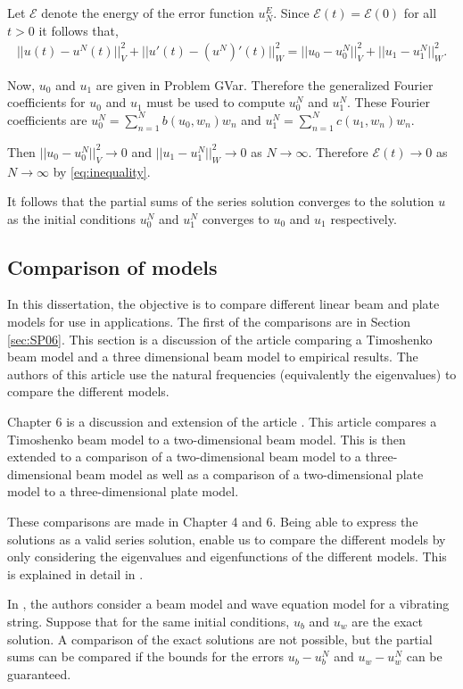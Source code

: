 \documentclass[../../main.tex]{subfiles}
\begin{document}
Let $\mathcal{E}$ denote the energy of the error function $u^E_N$. Since $\mathcal{E}(t) = \mathcal{E}(0)$ for all $t>0$ it follows that, 
\begin{eqnarray}
	||u(t) -  u^N(t)||_V^2 + ||u'(t) - (u^N)'(t)||^2_W = ||u_0 - u^N_0||_V^2 + ||u_1 - u^N_1||_W^2. \label{eq:inequality}
\end{eqnarray}

Now, $u_0$ and $u_1$ are given in Problem GVar. Therefore the generalized Fourier coefficients for $u_0$ and $u_1$ must be used to compute $u_0^N$ and $u_1^N$. These Fourier coefficients are $\displaystyle u_0^N = \sum_{n=1}^{N} b(u_0, w_n)w_n$ and $\displaystyle u_1^N = \sum_{n=1}^{N} c(u_1, w_n)w_n$.

Then $||u_0 - u^N_0||_V^2 \rightarrow 0$ and $||u_1 - u^N_1||_W^2 \rightarrow 0$ as $N \rightarrow \infty$. Therefore $\mathcal{E}(t) \rightarrow 0$ as $N \rightarrow \infty$ by \eqref{eq:inequality}.


It follows that the partial sums of the series solution converges to the solution $u$ as the initial conditions $u_0^N$ and $u_1^N$ converges to $u_0$ and $u_1$ respectively.

\subsection{Comparison of models}

In this dissertation, the objective is to compare different linear beam and plate models for use in applications. The first of the comparisons are in Section \ref{sec:SP06}. This section is a discussion of the article \cite{SP06} comparing a Timoshenko beam model and a three dimensional beam model to empirical results. The authors of this article use the natural frequencies (equivalently the eigenvalues) to compare the different models.

Chapter 6 is a discussion and extension of the article \cite{LVV09}. This article compares a Timoshenko beam model to a two-dimensional beam model. This is then extended to a comparison of a two-dimensional beam model to a three-dimensional beam model as well as a comparison of a two-dimensional plate model to a three-dimensional plate model.

These comparisons are made in Chapter 4 and 6. Being able to express the solutions as a valid series solution, enable us to compare the different models by only considering the eigenvalues and eigenfunctions of the different models. This is explained in detail in \cite{CVV18}.

In \cite{CVV18}, the authors consider a beam model and wave equation model for a vibrating string. Suppose that for the same initial conditions, $u_b$ and $u_w$ are the exact solution. A comparison of the exact solutions are not possible, but the partial sums can be compared if the bounds for the errors $u_b - u^N_b$ and $u_w - u^N_w$ can be guaranteed.
\end{document}
